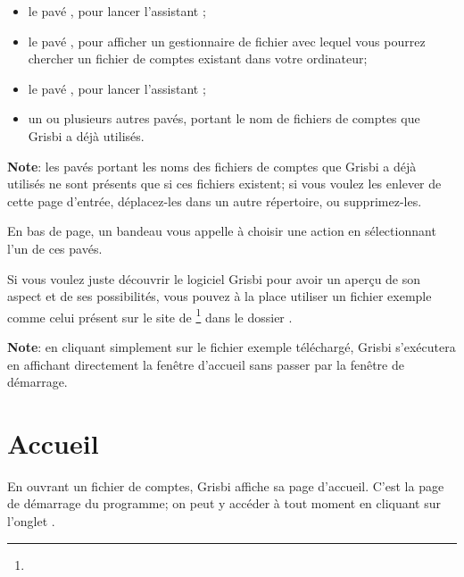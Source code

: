 \begin{itemize}
	\item le pavé , pour lancer l'assistant ;
	\item le pavé , pour afficher un gestionnaire de fichier avec lequel vous pourrez chercher un fichier de comptes existant dans votre ordinateur;
	\item le pavé , pour lancer l'assistant ;
	\item un ou plusieurs autres pavés, portant le nom de fichiers de comptes que Grisbi a déjà utilisés.
\end{itemize}


\textbf{Note}: les pavés portant les noms des fichiers de comptes que Grisbi a déjà utilisés ne sont présents que si ces fichiers existent; si vous voulez les enlever de cette page d'entrée, déplacez-les dans un autre répertoire, ou supprimez-les.


En bas de page, un bandeau vous appelle à choisir une action en sélectionnant l'un de ces pavés.


Si vous voulez juste découvrir le logiciel Grisbi pour avoir un aperçu de son aspect et de ses possibilités, vous pouvez à la place utiliser un fichier exemple comme celui présent sur le site de \footnote{\urlSourceForgeDocumentation{}} dans le dossier .		%


\textbf{Note}: en cliquant simplement sur le fichier exemple téléchargé, Grisbi s'exécutera en affichant directement la fenêtre d'accueil sans passer par la fenêtre de démarrage.


\section{Accueil\label{home}}


En ouvrant un fichier de comptes, Grisbi affiche sa page d'accueil.
C'est la page de démarrage du programme; on peut y accéder à tout moment en cliquant sur l'onglet . 

